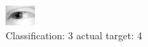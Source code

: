 \begin{figure}[h!]
\begin{center}
\includegraphics[width=0.60\columnwidth]{figures/ID2503_class_3_target_4.png}
\end{center}
\caption{ Classification: 3 actual target: 4}
\label{fig:ID2503_class_3_target_4}
\end{figure}
